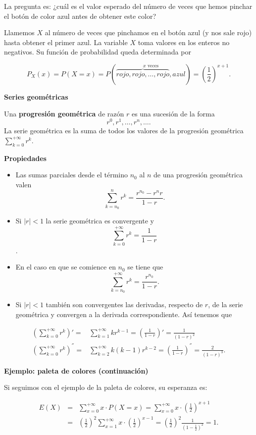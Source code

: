 \documentclass[
  letterpaper,
  DIV=11,
  numbers=noendperiod]{scrreprt}
\begin{document}
La pregunta es: ¿cuál es el valor esperado del número de veces que hemos
pinchar el botón de color azul antes de obtener este color?

Llamemos \(X\) al número de veces que pinchamos en el botón azul (y nos
sale rojo) hasta obtener el primer azul. La variable \(X\) toma valores
en los enteros no negativos. Su función de probabilidad queda
determinada por

\[
P_X(x)=P(X=x)=P(\stackrel{x \mbox{ veces}}{\overbrace{rojo, rojo,\ldots,rojo},azul})
=\left(\frac12\right)^{x+1}.
\]

\textbf{Series geométricas}

Una \textbf{progresión geométrica} de razón \(r\) es una sucesión de la
forma\\
\[
r^0, r^1,\ldots,r^n,\ldots.
\] La serie geométrica es la suma de todos los valores de la progresión
geométrica \(\displaystyle\sum_{k=0}^{+\infty} r^k\).

\textbf{Propiedades}

\begin{itemize}
\item
  Las sumas parciales desde el término \(n_0\) al \(n\) de una
  progresión geométrica valen \[
  \sum_{k=n_0}^n r^k=\frac{r^{n_0}- r^n r}{1-r}.
  \]
\item
  Si \(|r|<1\) la serie geométrica es convergente y
  \[\sum_{k=0}^{+\infty }
  r^k=\frac1{1-r}\].
\item
  En el caso en que se comience en \(n_0\) se tiene que
  \[\sum_{k=n_0}^{+\infty} r^k=\frac{r^{n_0}}{1-r}.\]
\item
  Si \(|r|<1\) también son convergentes las derivadas, respecto de
  \(r\), de la serie geométrica y convergen a la derivada
  correspondiente. Así tenemos que
\end{itemize}

\begin{eqnarray*}
\left(\sum_{k=0}^{+\infty} r^k\right)'= & \sum_{k=1}^{+\infty}k
r^{k-1} =  \left(\frac1{1-r}\right)'=\frac1{(1-r)^2}\\
\left(\sum_{k=0}^{+\infty} r^k\right)^{''}=& \sum_{k=2}^{+\infty}k (k-1)
r^{k-2} = \left(\frac1{1-r}\right)^{''}=\frac2{(1-r)^3}.
\end{eqnarray*}

\textbf{Ejemplo: paleta de colores (continuación)}

Si seguimos con el ejemplo de la paleta de colores, su esperanza es:

\begin{eqnarray*}
E(X)&=&\sum_{x=0}^{+\infty} x\cdot P(X=x)=\sum_{x=0}^{+\infty} x\cdot
\left(\frac12\right)^{x+1}\\
&= & \left(\frac12\right)^2\sum_{x=1}^{+\infty} x\cdot
\left(\frac12\right)^{x-1}=\left(\frac12\right)^2
\frac1{\left(1-\frac12\right)^2}=1.
\end{eqnarray*}
\end{document}
